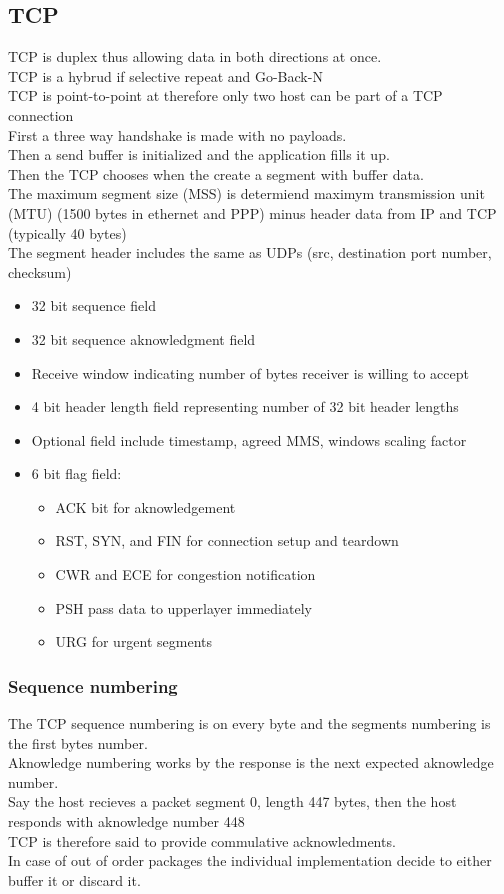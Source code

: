 \documentclass[12pt, a4paper]{article}
\begin{document}
		\subsection{TCP}
			TCP is duplex thus allowing data in both directions at once.\\
			TCP is a hybrud if selective repeat and Go-Back-N\\
			TCP is point-to-point at therefore only two host can be part of a TCP connection\\
			First a three way handshake is made with no payloads.\\
			Then a send buffer is initialized and the application fills it up.\\
			Then the TCP chooses when the create a segment with buffer data.\\
			The maximum segment size (MSS) is determiend maximym transmission unit (MTU) (1500 bytes in ethernet and PPP) minus header data from IP and TCP (typically 40 bytes) \\
			The segment header includes the same as UDPs (src, destination port number, checksum)
			\begin{itemize}
				\item 32 bit sequence field
				\item 32 bit sequence aknowledgment field
				\item Receive window indicating number of bytes receiver is willing to accept
				\item 4 bit header length field representing number of 32 bit header lengths
				\item Optional field include timestamp, agreed MMS, windows scaling factor 
				\item 6 bit flag field: 
				\begin{itemize}
					\item ACK bit for aknowledgement 
					\item RST, SYN, and FIN for connection setup and teardown
					\item CWR and ECE for congestion notification
					\item PSH pass data to upperlayer immediately
					\item URG for urgent segments
				\end{itemize}
			\end{itemize} 
			\subsubsection{Sequence numbering}
				The TCP sequence numbering is on every byte and the segments numbering is the first bytes number.\\
				Aknowledge numbering works by the response is the next expected aknowledge number. \\
				Say the host recieves a packet segment 0, length 447 bytes, then the host responds with aknowledge number 448\\
				TCP is therefore said to provide commulative acknowledments.\\
				In case of out of order packages the individual implementation decide to either buffer it or discard it.
\end{document}
